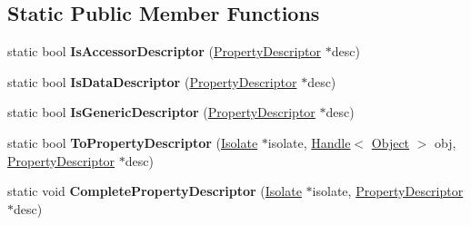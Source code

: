 \subsection*{Static Public Member Functions}
\begin{DoxyCompactItemize}
\item 
static bool {\bfseries Is\+Accessor\+Descriptor} (\hyperlink{classv8_1_1internal_1_1_property_descriptor}{Property\+Descriptor} $\ast$desc)\hypertarget{classv8_1_1internal_1_1_property_descriptor_a4ddd81c576fa1059e0250531c3757cb2}{}\label{classv8_1_1internal_1_1_property_descriptor_a4ddd81c576fa1059e0250531c3757cb2}

\item 
static bool {\bfseries Is\+Data\+Descriptor} (\hyperlink{classv8_1_1internal_1_1_property_descriptor}{Property\+Descriptor} $\ast$desc)\hypertarget{classv8_1_1internal_1_1_property_descriptor_abc27e04bfdb68402ee0d08540d7829ea}{}\label{classv8_1_1internal_1_1_property_descriptor_abc27e04bfdb68402ee0d08540d7829ea}

\item 
static bool {\bfseries Is\+Generic\+Descriptor} (\hyperlink{classv8_1_1internal_1_1_property_descriptor}{Property\+Descriptor} $\ast$desc)\hypertarget{classv8_1_1internal_1_1_property_descriptor_a8d62371003664fcb9147a158ec1bd6e5}{}\label{classv8_1_1internal_1_1_property_descriptor_a8d62371003664fcb9147a158ec1bd6e5}

\item 
static bool {\bfseries To\+Property\+Descriptor} (\hyperlink{classv8_1_1internal_1_1_isolate}{Isolate} $\ast$isolate, \hyperlink{classv8_1_1internal_1_1_handle}{Handle}$<$ \hyperlink{classv8_1_1internal_1_1_object}{Object} $>$ obj, \hyperlink{classv8_1_1internal_1_1_property_descriptor}{Property\+Descriptor} $\ast$desc)\hypertarget{classv8_1_1internal_1_1_property_descriptor_aeed9975d1f7309a3c84a6d5f1e9fb722}{}\label{classv8_1_1internal_1_1_property_descriptor_aeed9975d1f7309a3c84a6d5f1e9fb722}

\item 
static void {\bfseries Complete\+Property\+Descriptor} (\hyperlink{classv8_1_1internal_1_1_isolate}{Isolate} $\ast$isolate, \hyperlink{classv8_1_1internal_1_1_property_descriptor}{Property\+Descriptor} $\ast$desc)\hypertarget{classv8_1_1internal_1_1_property_descriptor_a8db7289399f6c1605a93e68359d1facd}{}\label{classv8_1_1internal_1_1_property_descriptor_a8db7289399f6c1605a93e68359d1facd}

\end{DoxyCompactItemize}
